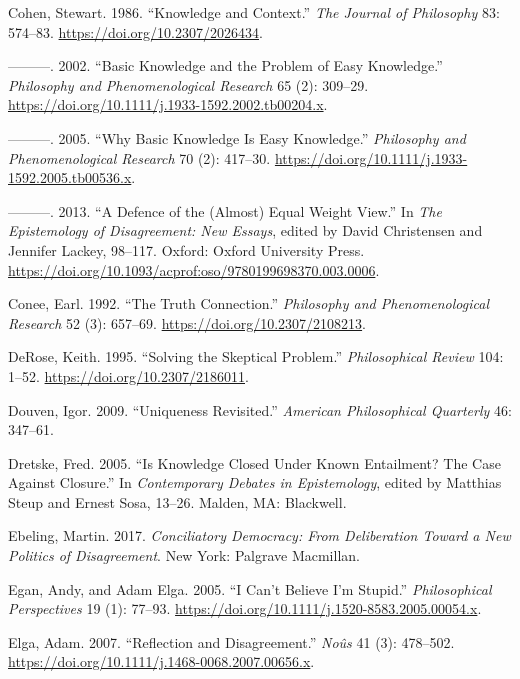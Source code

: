 \documentclass[
  10pt,
  letterpaper,
  twoside]{scrbook}
\newlength{\cslhangindent}
\newenvironment{CSLReferences}[2] %
 {\begin{list}{}{%
  \setlength{\itemindent}{0pt}
  \setlength{\leftmargin}{0pt}
  \setlength{\parsep}{0pt}
  \ifodd #1
   \setlength{\leftmargin}{\cslhangindent}
   \setlength{\itemindent}{-1\cslhangindent}
  \fi
  \setlength{\itemsep}{#2\baselineskip}}}
 {\end{list}}
\begin{document}
\begin{CSLReferences}{1}{0}
Cohen, Stewart. 1986. {``Knowledge and Context.''} \emph{The Journal of
Philosophy} 83: 574--83. \url{https://doi.org/10.2307/2026434}.

---------. 2002. {``Basic Knowledge and the Problem of Easy
Knowledge.''} \emph{Philosophy and Phenomenological Research} 65 (2):
309--29. \url{https://doi.org/10.1111/j.1933-1592.2002.tb00204.x}.

---------. 2005. {``Why Basic Knowledge Is Easy Knowledge.''}
\emph{Philosophy and Phenomenological Research} 70 (2): 417--30.
\url{https://doi.org/10.1111/j.1933-1592.2005.tb00536.x}.

---------. 2013. {``A Defence of the (Almost) Equal Weight View.''} In
\emph{The Epistemology of Disagreement: New Essays}, edited by David
Christensen and Jennifer Lackey, 98--117. Oxford: Oxford University
Press. \url{https://doi.org/10.1093/acprof:oso/9780199698370.003.0006}.

Conee, Earl. 1992. {``The Truth Connection.''} \emph{Philosophy and
Phenomenological Research} 52 (3): 657--69.
\url{https://doi.org/10.2307/2108213}.

DeRose, Keith. 1995. {``Solving the Skeptical Problem.''}
\emph{Philosophical Review} 104: 1--52.
\url{https://doi.org/10.2307/2186011}.

Douven, Igor. 2009. {``Uniqueness Revisited.''} \emph{American
Philosophical Quarterly} 46: 347--61.

Dretske, Fred. 2005. {``Is Knowledge Closed Under Known Entailment? The
Case Against Closure.''} In \emph{Contemporary Debates in Epistemology},
edited by Matthias Steup and Ernest Sosa, 13--26. Malden, MA: Blackwell.

Ebeling, Martin. 2017. \emph{Conciliatory Democracy: From Deliberation
Toward a New Politics of Disagreement}. New York: Palgrave Macmillan.

Egan, Andy, and Adam Elga. 2005. {``{I Can't Believe I'm Stupid}.''}
\emph{Philosophical Perspectives} 19 (1): 77--93.
\url{https://doi.org/10.1111/j.1520-8583.2005.00054.x}.

Elga, Adam. 2007. {``Reflection and Disagreement.''} \emph{No{û}s} 41
(3): 478--502. \url{https://doi.org/10.1111/j.1468-0068.2007.00656.x}.


\end{CSLReferences}
\end{document}
